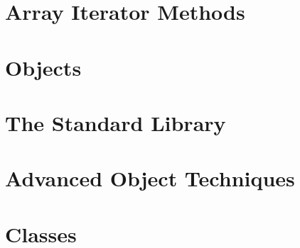 \documentclass[b5paper,openany]{book}
\begin{document}
\chapter{Array Iterator Methods}


\chapter{Objects}


\chapter{The Standard Library}


\chapter{Advanced Object Techniques}


\chapter{Classes}







\end{document}
